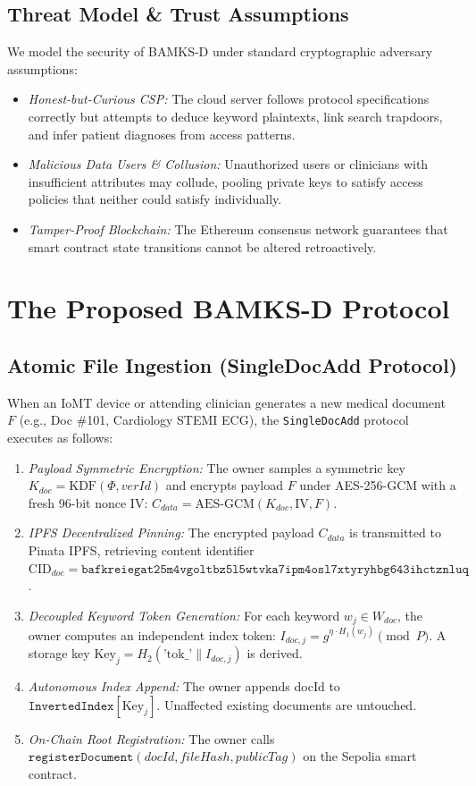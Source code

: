 \documentclass[journal,10pt,twocolumn]{IEEEtran}
\begin{document}
\subsection{Threat Model \& Trust Assumptions}
We model the security of BAMKS-D under standard cryptographic adversary assumptions:
\begin{itemize}
    \item \textit{Honest-but-Curious CSP:} The cloud server follows protocol specifications correctly but attempts to deduce keyword plaintexts, link search trapdoors, and infer patient diagnoses from access patterns.
    \item \textit{Malicious Data Users \& Collusion:} Unauthorized users or clinicians with insufficient attributes may collude, pooling private keys to satisfy access policies that neither could satisfy individually.
    \item \textit{Tamper-Proof Blockchain:} The Ethereum consensus network guarantees that smart contract state transitions cannot be altered retroactively.
\end{itemize}

\section{The Proposed BAMKS-D Protocol}

\subsection{Atomic File Ingestion (SingleDocAdd Protocol)}
When an IoMT device or attending clinician generates a new medical document $F$ (e.g., Doc \#101, Cardiology STEMI ECG), the \texttt{SingleDocAdd} protocol executes as follows:
\begin{enumerate}
    \item \textit{Payload Symmetric Encryption:} The owner samples a symmetric key $K_{doc} = \text{KDF}(\Phi, verId)$ and encrypts payload $F$ under AES-256-GCM with a fresh 96-bit nonce IV: $C_{data} = \text{AES-GCM}(K_{doc}, \text{IV}, F)$.
    \item \textit{IPFS Decentralized Pinning:} The encrypted payload $C_{data}$ is transmitted to Pinata IPFS, retrieving content identifier $\text{CID}_{doc} = \texttt{bafkreiegat25m4vgoltbz5l5wtvka7ipm4osl7xtyryhbg643ihctznluq}$.
    \item \textit{Decoupled Keyword Token Generation:} For each keyword $w_j \in W_{doc}$, the owner computes an independent index token: $I_{doc,j} = g^{\eta \cdot H_1(w_j)} \pmod P$. A storage key $\text{Key}_j = H_2(\text{'tok\_'} \parallel I_{doc,j})$ is derived.
    \item \textit{Autonomous Index Append:} The owner appends docId to $\texttt{InvertedIndex}[\text{Key}_j]$. Unaffected existing documents are untouched.
    \item \textit{On-Chain Root Registration:} The owner calls $\texttt{registerDocument}(docId, fileHash, publicTag)$ on the Sepolia smart contract.
\end{enumerate}
\end{document}
